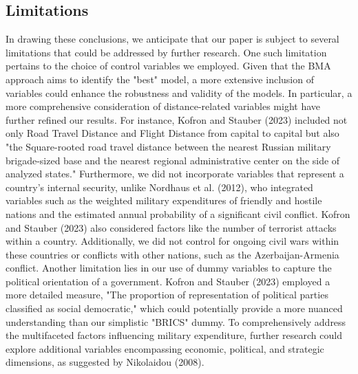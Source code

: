 \documentclass[12pt,a4paper]{article}
\begin{document}
\subsection{Limitations}
In drawing these conclusions, we anticipate that our paper is subject to several limitations that could be addressed by further research. One such limitation pertains to the choice of control variables we employed. Given that the BMA approach aims to identify the "best" model, a more extensive inclusion of variables could enhance the robustness and validity of the models. In particular, a more comprehensive consideration of distance-related variables might have further refined our results. For instance, Kofron and Stauber (2023) included not only Road Travel Distance and Flight Distance from capital to capital but also "the Square-rooted road travel distance between the nearest Russian military brigade-sized base and the nearest regional administrative center on the side of analyzed states." Furthermore, we did not incorporate variables that represent a country's internal security, unlike Nordhaus et al. (2012), who integrated variables such as the weighted military expenditures of friendly and hostile nations and the estimated annual probability of a significant civil conflict. Kofron and Stauber (2023) also considered factors like the number of terrorist attacks within a country. Additionally, we did not control for ongoing civil wars within these countries or conflicts with other nations, such as the Azerbaijan-Armenia conflict. Another limitation lies in our use of dummy variables to capture the political orientation of a government. Kofron and Stauber (2023) employed a more detailed measure, "The proportion of representation of political parties classified as social democratic," which could potentially provide a more nuanced understanding than our simplistic "BRICS" dummy. To comprehensively address the multifaceted factors influencing military expenditure, further research could explore additional variables encompassing economic, political, and strategic dimensions, as suggested by Nikolaidou (2008).\\
\end{document}
